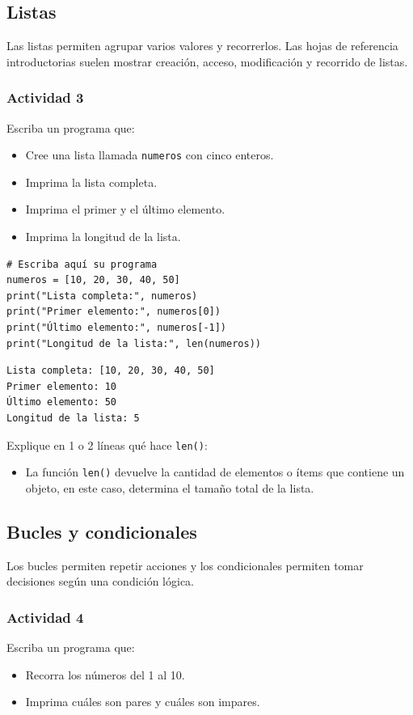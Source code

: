\documentclass{article}
\begin{document}
\subsection{Listas}
\label{sec:orgc2543de}
Las listas permiten agrupar varios valores y recorrerlos. Las hojas de
referencia introductorias suelen mostrar creación, acceso,
modificación y recorrido de listas.

\subsubsection{Actividad 3}
\label{sec:org9792916}
Escriba un programa que:
\begin{itemize}
\item Cree una lista llamada \texttt{numeros} con cinco enteros.
\item Imprima la lista completa.
\item Imprima el primer y el último elemento.
\item Imprima la longitud de la lista.
\end{itemize}

\begin{verbatim}
# Escriba aquí su programa
numeros = [10, 20, 30, 40, 50]
print("Lista completa:", numeros)
print("Primer elemento:", numeros[0])
print("Último elemento:", numeros[-1])
print("Longitud de la lista:", len(numeros))
\end{verbatim}

\begin{verbatim}
Lista completa: [10, 20, 30, 40, 50]
Primer elemento: 10
Último elemento: 50
Longitud de la lista: 5
\end{verbatim}


Explique en 1 o 2 líneas qué hace \texttt{len()}:
\begin{itemize}
\item La función \texttt{len()} devuelve la cantidad de elementos o ítems que contiene un objeto, en este caso, determina el tamaño total de la lista.
\end{itemize}

\subsection{Bucles y condicionales}
\label{sec:org3516733}
Los bucles permiten repetir acciones y los condicionales permiten tomar decisiones según una condición lógica.

\subsubsection{Actividad 4}
\label{sec:org69e55e6}
Escriba un programa que:
\begin{itemize}
\item Recorra los números del 1 al 10.
\item Imprima cuáles son pares y cuáles son impares.
\end{itemize}
\end{document}
